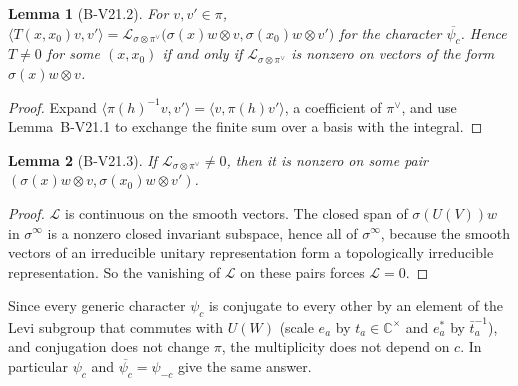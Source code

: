 \documentclass[11pt]{article}
\newtheorem{lemma}{Lemma}
\theoremstyle{definition}
\begin{document}
\begin{lemma}[B-V21.2]
For $v,v'\in\pi$, $\langle T(x,x_0)v,v'\rangle=\mathcal L_{\sigma\otimes\pi^\vee}\bigl(\sigma(x)w\otimes v,\sigma(x_0)w\otimes v'\bigr)$ for the character $\overline{\psi_c}$. Hence $T\ne0$ for some $(x,x_0)$ if and only if $\mathcal L_{\sigma\otimes\pi^\vee}$ is nonzero on vectors of the form $\sigma(x)w\otimes v$.
\end{lemma}
\begin{proof}
Expand $\langle\pi(h)^{-1}v,v'\rangle=\langle v,\pi(h)v'\rangle$, a coefficient of $\pi^\vee$, and use Lemma~B-V21.1 to exchange the finite sum over a basis with the integral.
\end{proof}

\begin{lemma}[B-V21.3]
If $\mathcal L_{\sigma\otimes\pi^\vee}\ne0$, then it is nonzero on some pair $(\sigma(x)w\otimes v,\sigma(x_0)w\otimes v')$.
\end{lemma}
\begin{proof}
$\mathcal L$ is continuous on the smooth vectors. The closed span of $\sigma(U(V))w$ in $\sigma^\infty$ is a nonzero closed invariant subspace, hence all of $\sigma^\infty$, because the smooth vectors of an irreducible unitary representation form a topologically irreducible representation. So the vanishing of $\mathcal L$ on these pairs forces $\mathcal L=0$.
\end{proof}

Since every generic character $\psi_c$ is conjugate to every other by an element of the Levi subgroup that commutes with $U(W)$ (scale $e_a$ by $t_a\in\mathbb C^\times$ and $e^*_a$ by $\bar t_a^{-1}$), and conjugation does not change $\pi$, the multiplicity does not depend on $c$. In particular $\psi_c$ and $\overline{\psi_c}=\psi_{-c}$ give the same answer.
\end{document}
